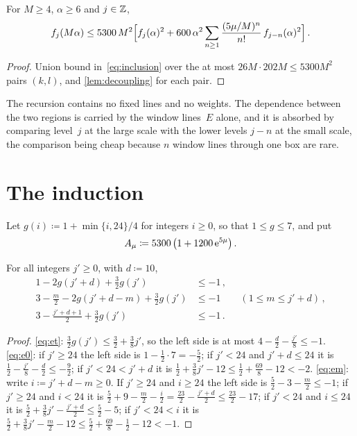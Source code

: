 \documentclass[11pt,letterpaper]{article}
\begin{document}
\begin{proposition}[Recursion]
\label{prop:recursion}
For $M\ge4$, $\alpha\ge6$ and $j\in\mathbb Z$,
\begin{equation}
\label{eq:recursion}
  f_j(M\alpha)\le5300\,M^2\Bigl[f_j(\alpha)^2+600\,\alpha^2\sum_{n\ge1}\frac{(5\mu/M)^n}{n!}\,f_{j-n}(\alpha)^2\Bigr]\,.
\end{equation}
\end{proposition}

\begin{proof}
Union bound in~\eqref{eq:inclusion} over the at most $26M\cdot202M\le5300M^2$ pairs $(k,l)$, and \cref{lem:decoupling} for each pair.
\end{proof}

The recursion contains no fixed lines and no weights. The dependence between the two regions is carried by the window lines~$E$ alone, and it is absorbed by comparing level~$j$ at the large scale with the lower levels $j-n$ at the small scale, the comparison being cheap because $n$ window lines through one box are rare.

\section{The induction}
\label{sec:induction}

Let $g(i)\coloneqq1+\min\{i,24\}/4$ for integers $i\ge0$, so that $1\le g\le7$, and put
\begin{equation}
\label{eq:Amu}
  A_\mu\coloneqq5300\,\bigl(1+1200\,\mathrm{e}^{5\mu}\bigr)\,.
\end{equation}

\begin{lemma}[Arithmetic]
\label{lem:arithmetic}
For all integers $j'\ge0$, with $d\coloneqq10$,
\begin{align}
\label{eq:e0}
  1-2g(j'+d)+\tfrac32g(j')&\le-1\,,\\
\label{eq:em}
  3-\tfrac m2-2g(j'+d-m)+\tfrac32g(j')&\le-1\qquad(1\le m\le j'+d)\,,\\
\label{eq:et}
  3-\tfrac{j'+d+1}{2}+\tfrac32g(j')&\le-1\,.
\end{align}
\end{lemma}

\begin{proof}
\eqref{eq:et}: $\frac32g(j')\le\frac32+\frac38j'$, so the left side is at most $4-\frac d2-\frac{j'}{8}\le-1$. \eqref{eq:e0}: if $j'\ge24$ the left side is $1-\frac12\cdot7=-\frac52$; if $j'<24$ and $j'+d\le24$ it is $\frac12-\frac{j'}8-\frac d2\le-\frac92$; if $j'<24<j'+d$ it is $\frac12+\frac38j'-12\le\frac12+\frac{69}{8}-12<-2$. \eqref{eq:em}: write $i\coloneqq j'+d-m\ge0$. If $j'\ge24$ and $i\ge24$ the left side is $\frac52-3-\frac m2\le-1$; if $j'\ge24$ and $i<24$ it is $\frac52+9-\frac m2-\frac i2=\frac{23}{2}-\frac{j'+d}{2}\le\frac{23}{2}-17$; if $j'<24$ and $i\le24$ it is $\frac52+\frac38j'-\frac{j'+d}{2}\le\frac52-5$; if $j'<24<i$ it is $\frac52+\frac38j'-\frac m2-12\le\frac52+\frac{69}{8}-\frac12-12<-1$.
\end{proof}
\end{document}
